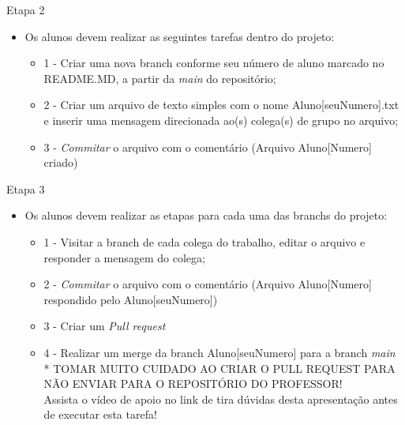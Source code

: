 \documentclass{beamer}
\begin{document}
\begin{frame}{Etapa 2}
      \begin{itemize}
            \item Os alunos devem realizar as seguintes tarefas dentro do projeto:
                  \begin{itemize}
                        \item 1 - Criar uma nova branch conforme seu número de aluno marcado no README.MD, a partir da \textit{main} do repositório;
                        \item 2 - Criar um arquivo de texto simples  com o nome Aluno[seuNumero].txt e inserir uma mensagem direcionada ao(s) colega(s) de grupo no arquivo;
                        \item 3 - \textit{Commitar} o arquivo com o comentário (Arquivo Aluno[Numero] criado)
            \end{itemize}
      \end{itemize}
\end{frame}


\begin{frame}{Etapa 3}
      \begin{itemize}
            \item Os alunos devem realizar as etapas para cada uma das branchs do projeto:
                  \begin{itemize}
                        \item 1 - Visitar a branch de cada colega do trabalho, editar o arquivo e responder a mensagem do colega;
                        \item 2 - \textit{Commitar} o arquivo com o comentário (Arquivo Aluno[Numero] respondido pelo Aluno[seuNumero])
                        \item 3 - Criar um \textit{Pull request}
                        \item 4 - Realizar um merge da branch Aluno[seuNumero] para a branch \textit{main}
                        \\ \textcolor{sintefyellow}{* TOMAR MUITO CUIDADO AO CRIAR O PULL REQUEST PARA NÃO ENVIAR PARA O REPOSITÓRIO DO PROFESSOR!}
                        \\ \textcolor{sintefred}{Assista o vídeo de apoio no link de tira dúvidas desta apresentação antes de executar esta tarefa!}
            \end{itemize}
      \end{itemize}
\end{frame}
\end{document}
